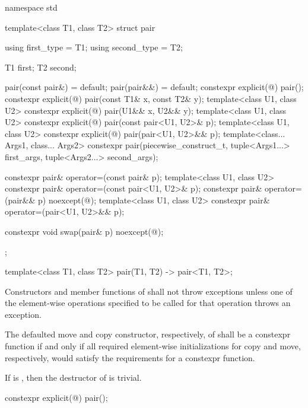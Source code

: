 %
\begin{codeblock}
namespace std {
  template<class T1, class T2>
  struct pair {
    using first_type  = T1;
    using second_type = T2;

    T1 first;
    T2 second;

    pair(const pair&) = default;
    pair(pair&&) = default;
    constexpr explicit(@\seebelow@) pair();
    constexpr explicit(@\seebelow@) pair(const T1& x, const T2& y);
    template<class U1, class U2>
      constexpr explicit(@\seebelow@) pair(U1&& x, U2&& y);
    template<class U1, class U2>
      constexpr explicit(@\seebelow@) pair(const pair<U1, U2>& p);
    template<class U1, class U2>
      constexpr explicit(@\seebelow@) pair(pair<U1, U2>&& p);
    template<class... Args1, class... Args2>
      constexpr pair(piecewise_construct_t,
                     tuple<Args1...> first_args, tuple<Args2...> second_args);

    constexpr pair& operator=(const pair& p);
    template<class U1, class U2>
      constexpr pair& operator=(const pair<U1, U2>& p);
    constexpr pair& operator=(pair&& p) noexcept(@\seebelow@);
    template<class U1, class U2>
      constexpr pair& operator=(pair<U1, U2>&& p);

    constexpr void swap(pair& p) noexcept(@\seebelow@);
  };

  template<class T1, class T2>
    pair(T1, T2) -> pair<T1, T2>;
}
\end{codeblock}

\pnum
Constructors and member functions of  shall not throw exceptions unless one of
the element-wise operations specified to be called for that operation
throws an exception.

\pnum
The defaulted move and copy constructor, respectively, of  shall
be a constexpr function if and only if all required element-wise
initializations for copy and move, respectively, would satisfy the
requirements for a constexpr function.

\pnum
If 
is , then the destructor of  is trivial.

%
\begin{itemdecl}
constexpr explicit(@\seebelow@) pair();
\end{itemdecl}

